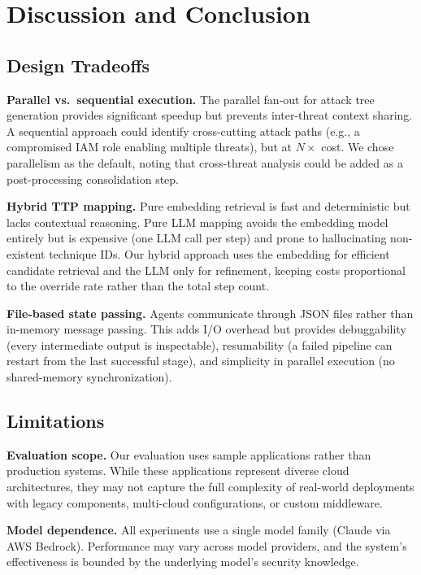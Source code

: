\section{Discussion and Conclusion}
\label{sec:discussion}

\subsection{Design Tradeoffs}

\textbf{Parallel vs.\ sequential execution.} The parallel fan-out for attack tree generation provides significant speedup but prevents inter-threat context sharing. A sequential approach could identify cross-cutting attack paths (e.g., a compromised IAM role enabling multiple threats), but at $N\times$ cost. We chose parallelism as the default, noting that cross-threat analysis could be added as a post-processing consolidation step.

\textbf{Hybrid TTP mapping.} Pure embedding retrieval is fast and deterministic but lacks contextual reasoning. Pure LLM mapping avoids the embedding model entirely but is expensive (one LLM call per step) and prone to hallucinating non-existent technique IDs. Our hybrid approach uses the embedding for efficient candidate retrieval and the LLM only for refinement, keeping costs proportional to the override rate rather than the total step count.

\textbf{File-based state passing.} Agents communicate through JSON files rather than in-memory message passing. This adds I/O overhead but provides debuggability (every intermediate output is inspectable), resumability (a failed pipeline can restart from the last successful stage), and simplicity in parallel execution (no shared-memory synchronization).

\subsection{Limitations}

\textbf{Evaluation scope.} Our evaluation uses sample applications rather than production systems. While these applications represent diverse cloud architectures, they may not capture the full complexity of real-world deployments with legacy components, multi-cloud configurations, or custom middleware.

\textbf{Model dependence.} All experiments use a single model family (Claude via AWS Bedrock). Performance may vary across model providers, and the system's effectiveness is bounded by the underlying model's security knowledge.

